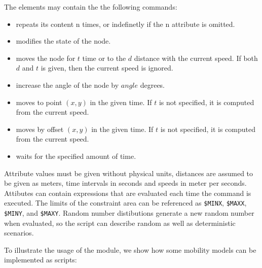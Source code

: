 The  elements may contain the the following commands:

\begin{itemize}
\item {} repeats its content n times, or indefinetly if the n attribute
              is omitted.
\item {} modifies the state of the node.
\item {} moves the node for $t$ time or to the $d$ distance
with the current speed. If both $d$ and $t$ is given, then the current
speed is ignored.
\item {} increase the angle of the node by $angle$ degrees.
\item {} moves to point $(x,y)$ in the given time. If
$t$ is not specified, it is computed from the current speed.
\item {} moves by offset $(x,y)$ in the given time. If
$t$ is not specified, it is computed from the current speed.
\item {} waits for the specified amount of time.
\end{itemize}

Attribute values must be given without physical units, distances are assumed
to be given as meters, time intervals in seconds and speeds in meter per seconds.
Attibutes can contain expressions that are evaluated each time the 
command is executed. The limits of the constraint area can be
referenced as \verb!$MINX!, \verb!$MAXX!, \verb!$MINY!, and \verb!$MAXY!.
Random number distibutions generate a new random number when evaluated,
so the script can describe random as well as deterministic scenarios.

To illustrate the usage of the module, we show how some mobility
models can be implemented as scripts:

